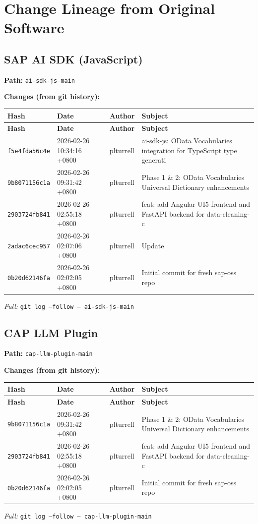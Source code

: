 \documentclass[11pt,a4paper]{article}
\begin{document}
\newpage
\section{Change Lineage from Original Software}

\subsection{SAP AI SDK (JavaScript)}
\textbf{Path:} \texttt{ai-sdk-js-main}

\textbf{Changes (from git history):}
\begin{longtable}{|p{2.2cm}|p{3.2cm}|l|p{6cm}|}
\hline \textbf{Hash} & \textbf{Date} & \textbf{Author} & \textbf{Subject} \\ \hline \endfirsthead
\hline \textbf{Hash} & \textbf{Date} & \textbf{Author} & \textbf{Subject} \\ \hline \endhead
\texttt{f5e4fda56c4e} & 2026-02-26 10:34:16 +0800 & plturrell & ai-sdk-js: OData Vocabularies integration for TypeScript type generati \\
\texttt{9b8071156c1a} & 2026-02-26 09:31:42 +0800 & plturrell & Phase 1 \& 2: OData Vocabularies Universal Dictionary enhancements \\
\texttt{2903724fb841} & 2026-02-26 02:55:18 +0800 & plturrell & feat: add Angular UI5 frontend and FastAPI backend for data-cleaning-c \\
\texttt{2adac6cec957} & 2026-02-26 02:07:06 +0800 & plturrell & Update \\
\texttt{0b20d62146fa} & 2026-02-26 02:02:05 +0800 & plturrell & Initial commit for fresh sap-oss repo \\
\hline
\end{longtable}
\textit{Full:} \texttt{git log --follow -- ai-sdk-js-main}

\subsection{CAP LLM Plugin}
\textbf{Path:} \texttt{cap-llm-plugin-main}

\textbf{Changes (from git history):}
\begin{longtable}{|p{2.2cm}|p{3.2cm}|l|p{6cm}|}
\hline \textbf{Hash} & \textbf{Date} & \textbf{Author} & \textbf{Subject} \\ \hline \endfirsthead
\hline \textbf{Hash} & \textbf{Date} & \textbf{Author} & \textbf{Subject} \\ \hline \endhead
\texttt{9b8071156c1a} & 2026-02-26 09:31:42 +0800 & plturrell & Phase 1 \& 2: OData Vocabularies Universal Dictionary enhancements \\
\texttt{2903724fb841} & 2026-02-26 02:55:18 +0800 & plturrell & feat: add Angular UI5 frontend and FastAPI backend for data-cleaning-c \\
\texttt{0b20d62146fa} & 2026-02-26 02:02:05 +0800 & plturrell & Initial commit for fresh sap-oss repo \\
\hline
\end{longtable}
\textit{Full:} \texttt{git log --follow -- cap-llm-plugin-main}
\end{document}
